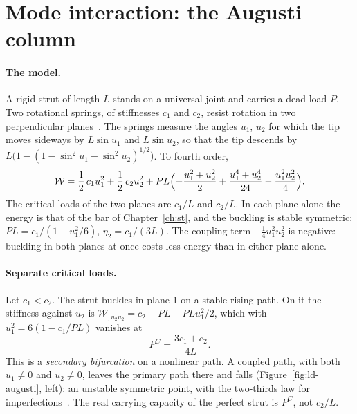 
\section{Mode interaction: the Augusti column}\label{sec:ld-interaction}
%

\paragraph{The model.}
A rigid strut of length $L$ stands on a universal joint and carries a dead load $P$.
Two rotational springs, of stiffnesses $c_1$ and $c_2$, resist rotation in two
perpendicular planes~\cite[Section~10.4]{ld-thompson1973}. The springs measure the
angles $u_1$, $u_2$ for which the tip moves sideways by $L\sin u_1$ and $L\sin u_2$,
so that the tip descends by $L\bigl(1 - (1 - \sin^2u_1 - \sin^2u_2)^{1/2}\bigr)$. To
fourth order,
\begin{equation}\label{eq:ld-augusti}
  \mathcal{W} = \frac12\,c_1u_1^2 + \frac12\,c_2u_2^2
  + PL\Bigl(-\frac{u_1^2 + u_2^2}{2} + \frac{u_1^4 + u_2^4}{24} - \frac{u_1^2u_2^2}{4}\Bigr).
\end{equation}
The critical loads of the two planes are $c_1/L$ and $c_2/L$. In each plane alone
the energy is that of the bar of Chapter~\ref{ch:st}, and the buckling is stable
symmetric: $PL = c_1/(1 - u_1^2/6)$, $\eta_2 = c_1/(3L)$. The coupling term
$-\tfrac14 u_1^2u_2^2$ is negative: buckling in both planes at once costs less energy
than in either plane alone.

\paragraph{Separate critical loads.}
Let $c_1 < c_2$. The strut buckles in plane 1 on a stable rising path. On it the
stiffness against $u_2$ is $\mathcal{W}_{,u_2u_2} = c_2 - PL - PLu_1^2/2$, which with
$u_1^2 = 6(1 - c_1/PL)$ vanishes at
\begin{equation}\label{eq:ld-augusti-secondary}
  P^C = \frac{3c_1 + c_2}{4L} .
\end{equation}
This is a \emph{secondary bifurcation} on a nonlinear path. A coupled path, with both
$u_1 \neq 0$ and $u_2 \neq 0$, leaves the primary path there and falls
(Figure~\ref{fig:ld-augusti}, left): an unstable symmetric point, with the two-thirds
law for imperfections~\cite[p.~249]{ld-thompson1973}. The real carrying capacity of the
perfect strut is $P^C$, not $c_2/L$.

